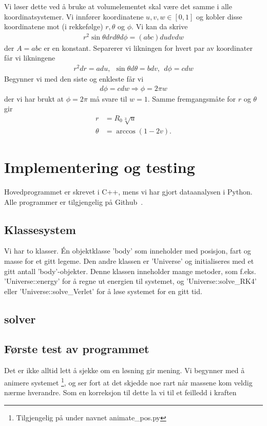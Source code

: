 \documentclass[11pt, twocolumn]{article}
\begin{document}
Vi løser dette ved å bruke at volumelementet skal være det samme i
alle koordinatsystemer. Vi innfører koordinatene $u, v, w \in [0,1]$
og kobler disse koordinatene mot (i rekkefølge) $r,\theta$ og
$\phi$. Vi kan da skrive 
\begin{align*}
  r^2\sin\theta dr d\theta d\phi = (abc)dudvdw
\end{align*}
der $A=abc$ er en konstant. Separerer vi likningen for hvert par av
koordinater får vi likningene 
\begin{align*}
  r^2dr = adu,\ \ \sin\theta d\theta = bdv,\ \ d\phi = cdw
\end{align*}
Begynner vi med den siste og enkleste får vi 
\begin{align}
  d\phi = cdw\Rightarrow \phi = 2\pi w
\end{align}
der vi har brukt at $\phi=2\pi$ må svare til $w=1$. Samme
fremgangsmåte for $r$ og $\theta$ gir
\begin{align}
  r &= R_0 \sqrt[3]{u}\\
  \theta &= \arccos(1-2v).
\end{align}


\section{Implementering og testing}
Hovedprogrammet er skrevet i C++, mens vi har gjort dataanalysen i Python.
Alle programmer er tilgjengelig på Github~\cite{github-repo}. 

\subsection{Klassesystem}
Vi har to klasser. Én objektklasse 'body' som inneholder med posisjon, fart 
og masse for et gitt legeme. Den andre klassen er 'Universe' og initialiseres
med et gitt antall 'body'-objekter. Denne klassen inneholder mange metoder,
som f.eks. 'Universe::energy' for å regne ut energien til systemet, og 
'Universe::solve\_RK4' eller 'Universe::solve\_Verlet' for å løse systemet
for en gitt tid.
\subsection{solver}

\subsection{Første test av programmet}
Det er ikke alltid lett å sjekke om en løsning gir mening. Vi begynner med
å animere systemet \footnote{Tilgjengelig på \cite{github-repo} under navnet
animate\_pos.py}, og ser fort at det skjedde noe rart når massene kom veldig
nærme hverandre. Som en korreksjon til dette la vi til et feilledd i kraften
\end{document}
